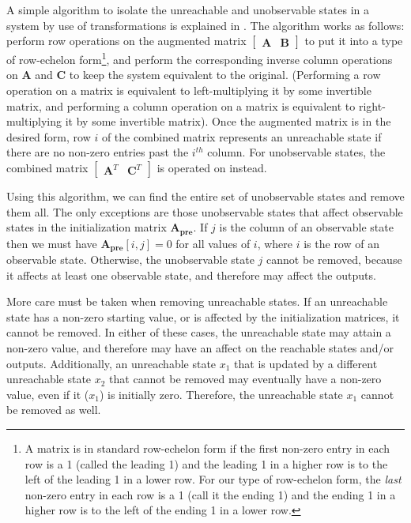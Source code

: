 A simple algorithm to isolate the unreachable and unobservable states
in a system by use of transformations is explained in
\cite{Mayne}. The algorithm works as follows: perform row
operations on the augmented matrix $\left [ \begin{array} {cc}
\mathbf{A} & \mathbf{B} \end{array} \right ]$ to put it into a
type of row-echelon form\footnote{A matrix is in standard row-echelon
form if the first non-zero entry in each row is a 1 (called the
leading 1) and the leading 1 in a higher row is to the left of the
leading 1 in a lower row. For our type of row-echelon form, the
\emph{last} non-zero entry in each row is a 1 (call it the ending 1)
and the ending 1 in a higher row is to the left of the ending 1 in a
lower row.}, and perform the corresponding inverse column operations
on $\mathbf{A}$ and $\mathbf{C}$ to keep the system equivalent to the
original. (Performing a row operation on a matrix is equivalent to
left-multiplying it by some invertible matrix, and performing a column
operation on a matrix is equivalent to right-multiplying it by some
invertible matrix).  Once the augmented matrix is in the desired form,
row $i$ of the combined matrix represents an unreachable state if
there are no non-zero entries past the $i^{th}$ column. For
unobservable states, the combined matrix $\left [ \begin{array} {cc}
\mathbf{A}^T & \mathbf{C}^T
\end{array} \right ]$ is operated on instead.

Using this algorithm, we can find the entire set of unobservable
states and remove them all. The only exceptions are those unobservable
states that affect observable states in the initialization matrix
$\mathbf{A_{pre}}$. If $j$ is the column of an observable state then
we must have $\mathbf{A_{pre}}[i,j] = 0$ for all values of $i$, where
$i$ is the row of an observable state. Otherwise, the unobservable
state $j$ cannot be removed, because it affects at least one
observable state, and therefore may affect the outputs.

More care must be taken when removing unreachable states. If an
unreachable state has a non-zero starting value, or is affected by the
initialization matrices, it cannot be removed. In either of these
cases, the unreachable state may attain a non-zero value, and
therefore may have an affect on the reachable states and/or
outputs. Additionally, an unreachable state $x_1$ that is updated by a
different unreachable state $x_2$ that cannot be removed may
eventually have a non-zero value, even if it ($x_1$) is initially
zero. Therefore, the unreachable state $x_1$ cannot be removed as
well.

